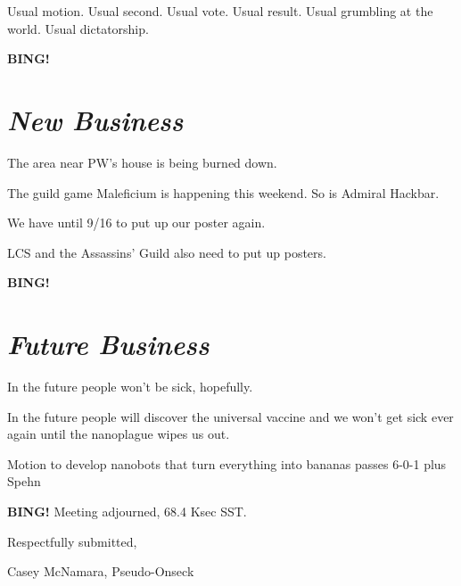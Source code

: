 \documentclass[10pt]{article}
\newcommand{\bing}{{\bf BING!} }
\newcommand{\goto}[1]{\bing \vskip 12pt \section*{{\em{#1}}}}
\newcommand{\ps}{ plus Spehn\xspace}
\newcommand{\onseck}{Casey McNamara, Pseudo-Onseck}
\begin{document}
Usual motion.  Usual second.  Usual vote.  Usual result.  Usual grumbling at the world.  Usual dictatorship.

\goto{New Business}

The area near PW's house is being burned down.

The guild game Maleficium is happening this weekend.  So is Admiral Hackbar.

We have until 9/16 to put up our poster again.

LCS and the Assassins' Guild also need to put up posters.

\goto{Future Business}

In the future people won't be sick, hopefully.

In the future people will discover the universal vaccine and we won't get sick ever again until the nanoplague wipes us out.

Motion to develop nanobots that turn everything into bananas passes 6-0-1 \ps

\bing
\noindent
Meeting adjourned, 68.4 Ksec SST.

\vspace{18pt}

\centerline{Respectfully submitted,}
\centerline{\onseck}
\end{document}
